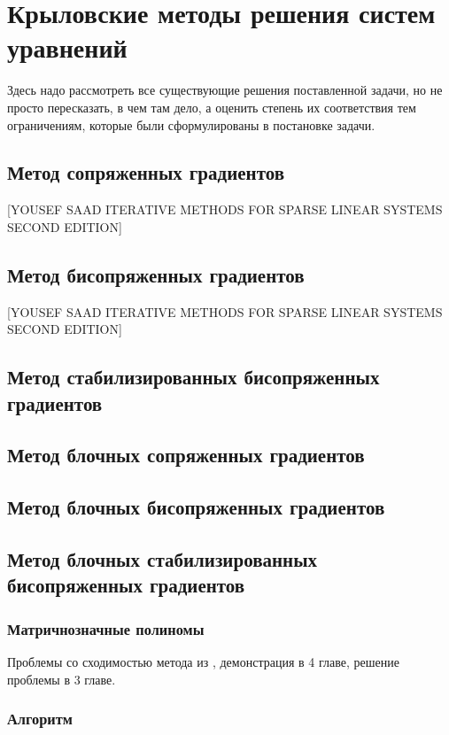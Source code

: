 \section{Крыловские методы решения систем уравнений}
\label{sec:Chapter2} 

Здесь надо рассмотреть все существующие решения поставленной задачи, но не
просто пересказать, в чем там дело, а оценить степень их соответствия тем
ограничениям, которые были сформулированы в постановке задачи.

\subsection{Метод сопряженных градиентов}
[YOUSEF SAAD ITERATIVE METHODS FOR SPARSE LINEAR SYSTEMS SECOND EDITION]
\subsection{Метод бисопряженных градиентов}
[YOUSEF SAAD ITERATIVE METHODS FOR SPARSE LINEAR SYSTEMS SECOND EDITION]
\subsection{Метод стабилизированных бисопряженных градиентов}
\cite{doi:10.1137/0913035}
\subsection{Метод блочных сопряженных градиентов}
\cite{OLEARY1980293}
\subsection{Метод блочных бисопряженных градиентов}
\cite{OLEARY1980293}
\subsection{Метод блочных стабилизированных бисопряженных градиентов}
\cite{elGuennouni2003}
\subsubsection{Матричнозначные полиномы}
 \par Проблемы со сходимостью метода из \cite{elGuennouni2003}, демонстрация в 4 главе, решение проблемы в 3 главе.
 \subsubsection{Алгоритм}


\newpage
